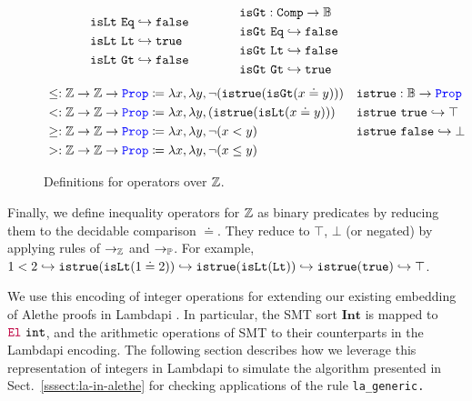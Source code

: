\begin{figure}[tb]
\[\begin{array}{l@{\hspace{4em}}l@{\hspace{4em}}l}
\begin{aligned}
  &\tt{isLt}~\tt{Eq} \re \tt{false} \\
  &\tt{isLt}~\tt{Lt} \re \tt{true} \\
  &\tt{isLt}~\tt{Gt} \re \tt{false} \\
\end{aligned}
&
\begin{aligned}
  &\tt{isGt} : \tt{Comp} \ra \bb{B} \\
  &\tt{isGt}~\tt{Eq} \re \tt{false} \\
  &\tt{isGt}~\tt{Lt} \re \tt{false} \\
  &\tt{isGt}~\tt{Gt} \re \tt{true} 
\end{aligned}
\end{array}
\]
\noindent
\begin{align*}
&\leq: \bb{Z} \ra \bb{Z} \ra \prop  \coloneq \lambda x,\lambda y, \neg (\tt{istrue}(\tt{isGt}(x \doteq y))) & &\tt{istrue} : \bb{B} \ra \prop \\
&<: \bb{Z} \ra \bb{Z} \ra \prop  \coloneq \lambda x,\lambda y, (\tt{istrue}(\tt{isLt}(x \doteq y))) & &\tt{istrue}~\tt{true} \re \top \\
&\geq: \bb{Z} \ra \bb{Z} \ra \prop  \coloneq \lambda x,\lambda y, \neg (x < y) & &\tt{istrue}~\tt{false} \re \bot \\
&>: \bb{Z} \ra \bb{Z} \ra \prop  \coloneq \lambda x,\lambda y, \neg (x \leq y) & &
\end{align*}
\caption{Definitions for operators over $\bb{Z}$.}
\label{fig:arith-ops}
\end{figure}

Finally, we define inequality operators for $\bb{Z}$ as binary predicates by reducing them to the decidable comparison $\doteq$. They reduce to $\top$, $\bot$ (or negated) by applying rules of $\ra_\bb{Z}$ and $\ra_\bb{P}$.
For example, $1 < 2 \hookrightarrow \tt{istrue}(\tt{isLt}(1 \doteq 2)) \hookrightarrow \tt{istrue}(\tt{isLt}(\tt{Lt})) \hookrightarrow \tt{istrue}(\tt{true}) \hookrightarrow \top$. %

We use this encoding of integer operations for extending our existing embedding of Alethe proofs in Lambdapi \cite{ColtellacciMD24}. In particular, the SMT sort $\textbf{Int}$ is mapped to $\el~\texttt{int}$, and the arithmetic operations of SMT to their counterparts in the Lambdapi encoding. The following section describes how we leverage this representation of integers in Lambdapi to simulate the algorithm presented in Sect.~\ref{sssect:la-in-alethe} for checking applications of the rule \tt{la\_generic}.

